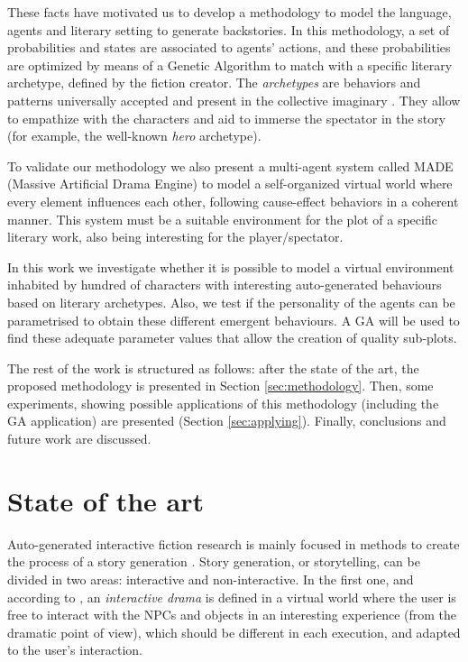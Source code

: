 \documentclass[letterpaper]{article}
\begin{document}
These facts have motivated us to develop a methodology to model the language, agents and literary setting to generate backstories. In this methodology, a set of probabilities and 
states are associated to agents' actions, and these probabilities are
optimized by means of a Genetic Algorithm to match with a
specific literary archetype, defined by the fiction creator. The {\em
archetypes} are behaviors and patterns universally accepted and
present in the collective imaginary
 \citep{ArchetypesGarry05}. They allow to empathize  
with the characters and aid to immerse the spectator in the story
(for example, the well-known {\em hero} archetype).






To validate our methodology we also present a multi-agent system called
MADE (Massive Artificial Drama Engine) to model a self-organized
virtual world where every element influences each other, following
cause-effect behaviors in a coherent manner. This system must be
a suitable environment for the plot of a specific literary work, also being
interesting for the player/spectator. 

In this work we investigate whether it is possible to model a virtual environment inhabited by hundred of characters with interesting auto-generated behaviours based on literary archetypes. Also, we test if the personality of the agents can be parametrised to obtain these different emergent behaviours. A GA will be used to find these adequate parameter values that allow the creation of quality sub-plots.


The rest of the work is structured as follows: after the state of the art, the proposed methodology is presented in Section \ref{sec:methodology}. Then, some experiments, showing possible applications of this methodology (including the GA application) are presented (Section \ref{sec:applying}). Finally, conclusions and future work are discussed.

\section{State of the art}
\label{sec:soa}



Auto-generated interactive fiction research is mainly focused in
methods to create the process of a story generation
\citep{nairat2011character}. Story generation, or storytelling, can be divided in two areas: interactive and non-interactive. In the first one, and
according to \citep{ReviewArinbjarnar09}, an {\em interactive drama} is
defined in a virtual world where the user is free to interact with
the NPCs and objects in an interesting experience (from the dramatic point of view), which should be different in each execution, and adapted to the user's interaction.
\end{document}

